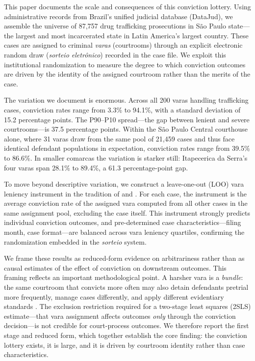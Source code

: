 \documentclass[12pt]{article}
\begin{document}
This paper documents the scale and consequences of this conviction lottery. Using administrative records from Brazil's unified judicial database (DataJud), we assemble the universe of 87,757 drug trafficking prosecutions in S\~ao Paulo state---the largest and most incarcerated state in Latin America's largest country. These cases are assigned to criminal \textit{varas} (courtrooms) through an explicit electronic random draw (\textit{sorteio eletr\^onico}) recorded in the case file. We exploit this institutional randomization to measure the degree to which conviction outcomes are driven by the identity of the assigned courtroom rather than the merits of the case.

The variation we document is enormous. Across all 200 varas handling trafficking cases, conviction rates range from 3.3\% to 94.1\%, with a standard deviation of 15.2 percentage points. The P90--P10 spread---the gap between lenient and severe courtrooms---is 37.5 percentage points. Within the S\~ao Paulo Central courthouse alone, where 31 varas draw from the same pool of 21,459 cases and thus face identical defendant populations in expectation, conviction rates range from 39.5\% to 86.6\%. In smaller comarcas the variation is starker still: Itapecerica da Serra's four varas span 28.1\% to 89.4\%, a 61.3 percentage-point gap.

To move beyond descriptive variation, we construct a leave-one-out (LOO) vara leniency instrument in the tradition of \citet{kling2006} and \citet{dobbie2018}. For each case, the instrument is the average conviction rate of the assigned vara computed from all other cases in the same assignment pool, excluding the case itself. This instrument strongly predicts individual conviction outcomes, and pre-determined case characteristics---filing month, case format---are balanced across vara leniency quartiles, confirming the randomization embedded in the \textit{sorteio} system.

We frame these results as reduced-form evidence on arbitrariness rather than as causal estimates of the effect of conviction on downstream outcomes. This framing reflects an important methodological point. A harsher vara is a \textit{bundle}: the same courtroom that convicts more often may also detain defendants pretrial more frequently, manage cases differently, and apply different evidentiary standards \citep{hull2025}. The exclusion restriction required for a two-stage least squares (2SLS) estimate---that vara assignment affects outcomes \textit{only} through the conviction decision---is not credible for court-process outcomes. We therefore report the first stage and reduced form, which together establish the core finding: the conviction lottery exists, it is large, and it is driven by courtroom identity rather than case characteristics.
\end{document}
